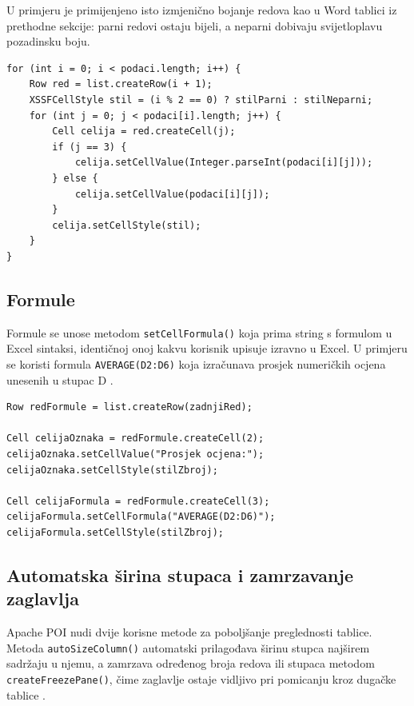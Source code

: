 \documentclass[]{foi}
\begin{document}
U primjeru je primijenjeno isto izmjenično bojanje redova kao u Word tablici iz prethodne sekcije: parni redovi ostaju bijeli, a neparni dobivaju svijetloplavu pozadinsku boju.

\begin{lstlisting}[style=java, caption={Popunjavanje tablice podacima}]
for (int i = 0; i < podaci.length; i++) {
    Row red = list.createRow(i + 1);
    XSSFCellStyle stil = (i % 2 == 0) ? stilParni : stilNeparni;
    for (int j = 0; j < podaci[i].length; j++) {
        Cell celija = red.createCell(j);
        if (j == 3) {
            celija.setCellValue(Integer.parseInt(podaci[i][j]));
        } else {
            celija.setCellValue(podaci[i][j]);
        }
        celija.setCellStyle(stil);
    }
}
\end{lstlisting}

\subsection{Formule}

Formule se unose metodom \texttt{setCellFormula()} koja prima string s formulom u Excel sintaksi, identičnoj onoj kakvu korisnik upisuje izravno u Excel. U primjeru se koristi formula \texttt{AVERAGE(D2:D6)} koja izračunava prosjek numeričkih ocjena unesenih u stupac D \cite{apachePOISpreadsheetQuickGuide}.

\begin{lstlisting}[style=java, caption={Unos formule i formatiranje retka}]
Row redFormule = list.createRow(zadnjiRed);

Cell celijaOznaka = redFormule.createCell(2);
celijaOznaka.setCellValue("Prosjek ocjena:");
celijaOznaka.setCellStyle(stilZbroj);

Cell celijaFormula = redFormule.createCell(3);
celijaFormula.setCellFormula("AVERAGE(D2:D6)");
celijaFormula.setCellStyle(stilZbroj);
\end{lstlisting}

\subsection{Automatska širina stupaca i zamrzavanje zaglavlja}

Apache POI nudi dvije korisne metode za poboljšanje preglednosti tablice. Metoda \texttt{autoSizeColumn()} automatski prilagođava širinu stupca najširem sadržaju u njemu, a zamrzava određenog broja redova ili stupaca metodom \texttt{createFreezePane()}, čime zaglavlje ostaje vidljivo pri pomicanju kroz dugačke tablice \cite{apachePOISpreadsheetQuickGuide}.
\end{document}
